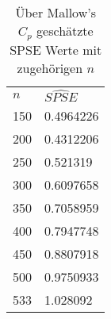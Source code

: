\begin{table}[]
    \centering
	\begin{tabular}{|l|l|}
		\cline{1-2}
		$n$   & $\hat{SPSE}$ \\ 		\cline{1-2}
		150 &  0.4964226   \\ \cline{1-2}
		200 &  0.4312206   \\ \cline{1-2}
		250 &  0.521319    \\ \cline{1-2}
		300 &  0.6097658  \\ \cline{1-2}
		350 &  0.7058959   \\ \cline{1-2}
		400 &  0.7947748 \\ \cline{1-2}
		450 &  0.8807918  \\ \cline{1-2}
		500 &  0.9750933   \\ \cline{1-2}
		533 &  1.028092   \\ \cline{1-2}

	\end{tabular}
	\caption{Über Mallow's $C_p$ geschätzte SPSE Werte mit zugehörigen $n$}
\end{table}